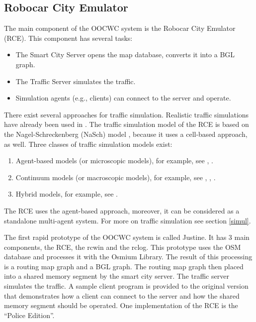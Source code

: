 \documentclass[b5paper,12pt]{report}
\theoremstyle{definition}
\begin{document}
\subsection{Robocar City Emulator}
\label{rcemu}

The main component of the OOCWC system is the Robocar City Emulator (RCE). This component has several tasks:
\begin{itemize}
\item The Smart City Server opens the map database, converts it into a BGL graph.
\item The Traffic Server simulates the traffic.
\item Simulation agents (e.g., clients) can connect to the server and operate.
\end{itemize}

There exist several approaches for traffic simulation. Realistic traffic simulations have already been used in \cite{realsim}. The traffic simulation model of the RCE is based on the Nagel-Schreckenberg (NaSch) model \cite{nasch}, because it uses a cell-based approach, as well. Three classes of traffic simulation models exist: 

\begin{enumerate}
  \item Agent-based models (or microscopic models), for example, see \cite{treiber2000congested}, \cite{duncan1997high}.
  \item Continuum models (or macroscopic models), for example, see \cite{fan2013comparative}, \cite{sewall2010continuum}, \cite{chrobok2001traffic}.
  \item Hybrid models, for example, see \cite{sewall2011interactive}.
\end{enumerate}

The RCE uses the agent-based approach, moreover, it can be considered as a standalone multi-agent system. For more on traffic simulation see section \ref{simul}.

The first rapid prototype of the OOCWC system is called Justine. It has 3 main components, the RCE, the rcwin and the rclog. This prototype uses the OSM database and processes it with the Osmium Library. The result of this processing is a routing map graph and a BGL graph. The routing map graph then placed into a shared memory segment by the smart city server. The traffic server simulates the traffic. A sample client program is provided to the original version that demonstrates how a client can connect to the server and how the shared memory segment should be operated. One implementation of the RCE is the \enquote{Police Edition}.
\end{document}
